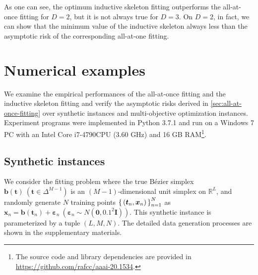 \documentclass[letterpaper]{article} %
\theoremstyle{plain}
\newcommand{\R}{\mathbb{R}}
\begin{document}
As one can see, the optimum inductive skeleton fitting outperforms the all-at-once fitting for $D = 2$, but it is not always true for $D = 3$.
On $D = 2$, in fact, we can show that the minimum value of the inductive skeleton always less than the asymptotic risk of the corresponding all-at-one fitting.


\section{Numerical examples}\label{sec:numerical-examples}
We examine the empirical performances of the all-at-once fitting and the inductive skeleton fitting and verify the asymptotic risks derived in \cref{sec:all-at-once-fitting} over synthetic instances and multi-objective optimization instances.
Experiment programs were implemented in Python 3.7.1 and run on a Windows 7 PC with an Intel Core i7-4790CPU (3.60 GHz) and 16 GB RAM\footnote{The source code and library dependencies are provided in \url{https://github.com/rafcc/aaai-20.1534}.}.


\subsection{Synthetic instances}\label{sec:synthetic-instances}
We consider the fitting problem where the true B\'ezier simplex $\bm b(\bm{t})~(\bm t \in \Delta^{M - 1})$ is an $(M - 1)$-dimensional unit simplex on $\R^L$, and randomly generate $N$ training points $\set{(\bm t_n, \bm x_n)}_{n = 1}^N$ as $\bm x_n = \bm b(\bm t_n) + \bm{\varepsilon}_n~(\bm \varepsilon_n \sim N(\bm 0, 0.1^2 \bm I))$.
This synthetic instance is parameterized by a tuple $(L, M, N)$.
The detailed data generation processes are shown in the supplementary materials. %
\end{document}
